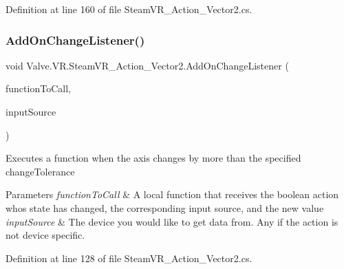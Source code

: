 Definition at line 160 of file Steam\+V\+R\+\_\+\+Action\+\_\+\+Vector2.\+cs.

\mbox{\label{class_valve_1_1_v_r_1_1_steam_v_r___action___vector2_a6ed8ca5d8b3b60d52a8c7d875506d3ad}} 
\subsubsection{\texorpdfstring{AddOnChangeListener()}{AddOnChangeListener()}}
{\footnotesize\ttfamily void Valve.\+V\+R.\+Steam\+V\+R\+\_\+\+Action\+\_\+\+Vector2.\+Add\+On\+Change\+Listener (\begin{DoxyParamCaption}\item[{\mbox{\hyperlink{class_valve_1_1_v_r_1_1_steam_v_r___action___vector2_ad390de62736aedd5be93238b1840ffec}{Change\+Handler}}}]{function\+To\+Call,  }\item[{\mbox{\hyperlink{namespace_valve_1_1_v_r_a82e5bf501cc3aa155444ee3f0662853f}{Steam\+V\+R\+\_\+\+Input\+\_\+\+Sources}}}]{input\+Source }\end{DoxyParamCaption})}



Executes a function when the axis changes by more than the specified change\+Tolerance 


\begin{DoxyParams}{Parameters}
{\em function\+To\+Call} & A local function that receives the boolean action who\textquotesingle{}s state has changed, the corresponding input source, and the new value\\
\hline
{\em input\+Source} & The device you would like to get data from. Any if the action is not device specific.\\
\hline
\end{DoxyParams}


Definition at line 128 of file Steam\+V\+R\+\_\+\+Action\+\_\+\+Vector2.\+cs.

\mbox{\label{class_valve_1_1_v_r_1_1_steam_v_r___action___vector2_a12df05b3e447aaa26cc81b9ccae3cd2c}} 
